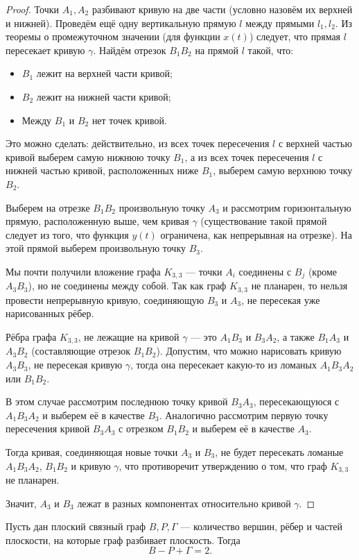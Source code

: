 \begin{proof}
    Точки $A_1, A_2$ разбивают кривую на две части (условно назовём их верхней и нижней). Проведём ещё одну вертикальную прямую $l$ между прямыми $l_1, l_2$. Из теоремы о промежуточном значении (для функции $x(t)$) следует, что прямая $l$ пересекает кривую $\gamma$. Найдём отрезок $B_1B_2$ на прямой $l$ такой, что:
    \begin{itemize}
        \item $B_1$ лежит на верхней части кривой;
        \item $B_2$ лежит на нижней части кривой;
        \item Между $B_1$ и $B_2$ нет точек кривой.
    \end{itemize}
    Это можно сделать: действительно, из всех точек пересечения $l$ с верхней частью кривой выберем самую нижнюю точку $B_1$, а из всех точек пересечения $l$ с нижней частью кривой, расположенных ниже $B_1$, выберем самую верхнюю точку $B_2$.

    Выберем на отрезке $B_1B_2$ произвольную точку $A_3$ и рассмотрим горизонтальную прямую, расположенную выше, чем кривая $\gamma$ (существование такой прямой следует из того, что функция $y(t)$ ограничена, как непрерывная на отрезке). На этой прямой выберем произвольную точку $B_3$.

    Мы почти получили вложение графа $K_{3,3}$ — точки $A_i$ соединены с $B_j$ (кроме $A_3B_3$), но не соединены между собой. Так как граф $K_{3,3}$ не планарен, то нельзя провести непрерывную кривую, соединяющую $B_3$ и $A_3$, не пересекая уже нарисованных рёбер.

    Рёбра графа $K_{3,3}$, не лежащие на кривой $\gamma$ — это $A_1B_3$ и $B_3A_2$, а также $B_1A_3$ и $A_3B_2$ (составляющие отрезок $B_1B_2$). Допустим, что можно нарисовать кривую $A_3B_3$, не пересекая кривую $\gamma$, тогда она пересекает какую-то из ломаных $A_1B_3A_2$ или $B_1B_2$.

    В этом случае рассмотрим последнюю точку кривой $B_3A_3$, пересекающуюся с $A_1B_3A_2$ и выберем её в качестве $B_3$. Аналогично рассмотрим первую точку пересечения кривой $B_3A_3$ с отрезком $B_1B_2$ и выберем её в качестве $A_3$.

    Тогда кривая, соединяющая новые точки $A_3$ и $B_3$, не будет пересекать ломаные $A_1B_3A_2$, $B_1B_2$ и кривую $\gamma$, что противоречит утверждению о том, что граф $K_{3,3}$ не планарен.

    Значит, $A_3$ и $B_3$ лежат в разных компонентах относительно кривой $\gamma$.
\end{proof}

\begin{theorem}[Эйлер]
    Пусть дан плоский связный граф $B, P, \Gamma$ — количество вершин, рёбер и частей плоскости, на которые граф разбивает плоскость. Тогда 
    \begin{equation}
        B - P + \Gamma = 2.
        \label{eyler}
    \end{equation}
\end{theorem}